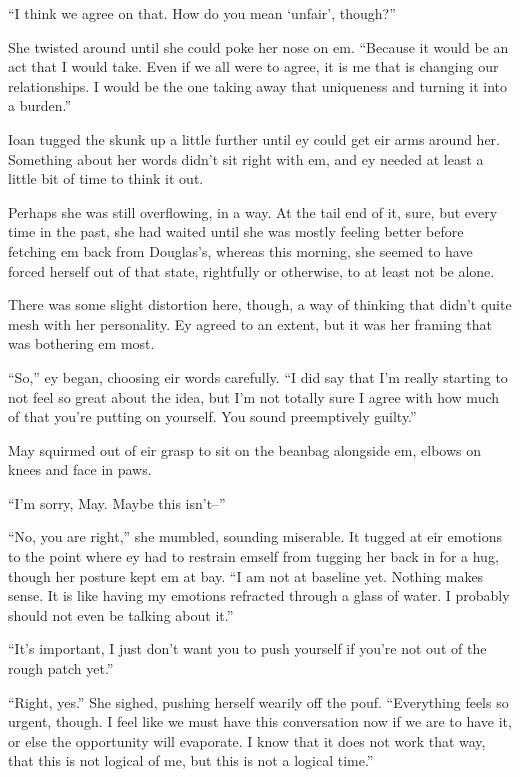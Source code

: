 ``I think we agree on that. How do you mean `unfair', though?''

She twisted around until she could poke her nose on em. ``Because it would be an act that I would take. Even if we all were to agree, it is me that is changing our relationships. I would be the one taking away that uniqueness and turning it into a burden.''

Ioan tugged the skunk up a little further until ey could get eir arms around her. Something about her words didn't sit right with em, and ey needed at least a little bit of time to think it out.

Perhaps she was still overflowing, in a way. At the tail end of it, sure, but every time in the past, she had waited until she was mostly feeling better before fetching em back from Douglas's, whereas this morning, she seemed to have forced herself out of that state, rightfully or otherwise, to at least not be alone.

There was some slight distortion here, though, a way of thinking that didn't quite mesh with her personality. Ey agreed to an extent, but it was her framing that was bothering em most.

``So,'' ey began, choosing eir words carefully. ``I did say that I'm really starting to not feel so great about the idea, but I'm not totally sure I agree with how much of that you're putting on yourself. You sound preemptively guilty.''

May squirmed out of eir grasp to sit on the beanbag alongside em, elbows on knees and face in paws.

``I'm sorry, May. Maybe this isn't--''

``No, you are right,'' she mumbled, sounding miserable. It tugged at eir emotions to the point where ey had to restrain emself from tugging her back in for a hug, though her posture kept em at bay. ``I am not at baseline yet. Nothing makes sense. It is like having my emotions refracted through a glass of water. I probably should not even be talking about it.''

``It's important, I just don't want you to push yourself if you're not out of the rough patch yet.''

``Right, yes.'' She sighed, pushing herself wearily off the pouf. ``Everything feels so urgent, though. I feel like we must have this conversation now if we are to have it, or else the opportunity will evaporate. I know that it does not work that way, that this is not logical of me, but this is not a logical time.''

